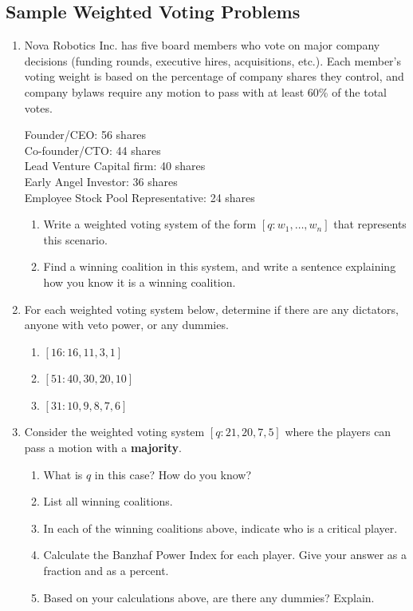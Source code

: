 \documentclass[12pt]{article}
\renewcommand{\emph}[1]{\textsf{\textbf{#1}}}
\def\be{\begin{enumerate}}
\def\ee{\end{enumerate}}
\begin{document}
\subsection{Sample Weighted Voting Problems}
\begin{enumerate}
\item Nova Robotics Inc. has five board members who vote on major company decisions (funding rounds, executive hires, acquisitions, etc.). Each member's voting weight is based on the percentage of company shares they control, and company bylaws require any motion to pass with at least 60\% of the total votes.

Founder/CEO: 56 shares\\
Co-founder/CTO: 44 shares\\
Lead Venture Capital firm: 40 shares\\
Early Angel Investor: 36 shares\\
Employee Stock Pool Representative: 24 shares\\

\be
\item Write a weighted voting system of the form $[q: w_{1}, \ldots, w_{n}]$ that represents this scenario. 

\vspace{1in}

\item Find a winning coalition in this system, and write a sentence explaining how you know it is a winning coalition.


\vspace{1in}
\ee

\newpage
\item For each weighted voting system below, determine if there are any dictators, anyone with veto power, or any dummies.
	\begin{enumerate}
	\item $[16:16,11,3,1]$
	\vfill
	\item $[51:40,30,20,10]$
	\vfill
	\item $[31:10,9,8,7,6]$
	\vfill
	\end{enumerate}
	
	\newpage
\item Consider the weighted voting system $[q:21,20,7,5]$ where the players can pass a motion with a \emph{majority}.
	\begin{enumerate}
	\item What is $q$ in this case? How do you know?
	
	\bigskip
		\bigskip

	
	\item List all winning coalitions.
	\vfill
	\item In each of the winning coalitions above, indicate who is a critical player.
	
	\item Calculate the Banzhaf Power Index for each player. Give your answer as a fraction and as a percent.
	\vfill
	\item Based on your calculations above, are there any dummies? Explain.
	\vfill
	\end{enumerate}
\end{enumerate}
\end{document}
